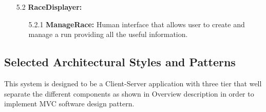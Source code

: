 \begin{enumerate}
\item[5.2] \textbf{RaceDisplayer: }
	\begin{enumerate}
		\item[5.2.1] \textbf{ManageRace: } Human interface that allows user to create and manage a run providing all the useful information.
	\end{enumerate}		

\end{enumerate}
\clearpage



\subsection{Selected Architectural Styles and Patterns}

This system is designed to be a Client-Server application with three tier that well separate the different components as shown in Overview description in order to implement MVC software design pattern.

